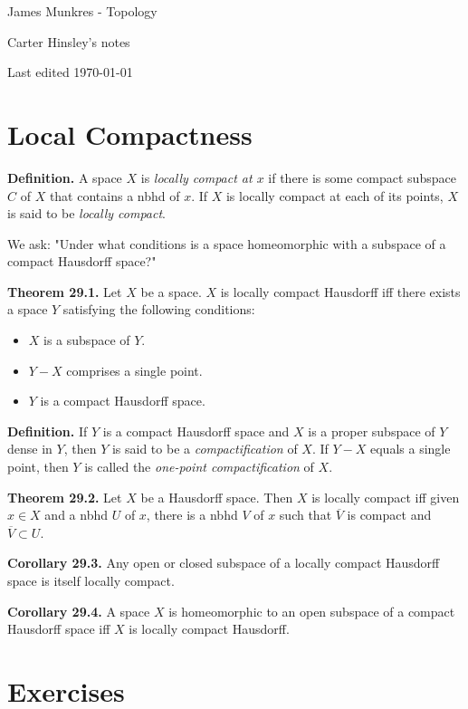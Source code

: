 \documentclass[a4paper]{article}
\begin{document}
\begin{center}
\LARGE{James Munkres - Topology}

\large{Carter Hinsley's notes}

Last edited \today
\end{center}

\setcounter{section}{28}
\section{Local Compactness}

\textbf{Definition.} A space $X$ is \emph{locally compact at $x$} if there is some compact subspace $C$ of $X$ that contains a nbhd of $x$. If $X$ is locally compact at each of its points, $X$ is said to be \emph{locally compact}.

We ask: "Under what conditions is a space homeomorphic with a subspace of a compact Hausdorff space?"

\textbf{Theorem 29.1.} Let $X$ be a space. $X$ is locally compact Hausdorff iff there exists a space $Y$ satisfying the following conditions:
\begin{itemize}
    \item $X$ is a subspace of $Y$.
    \item $Y - X$ comprises a single point.
    \item $Y$ is a compact Hausdorff space.
\end{itemize}

\textbf{Definition.} If $Y$ is a compact Hausdorff space and $X$ is a proper subspace of $Y$ dense in $Y$, then $Y$ is said to be a \emph{compactification} of $X$. If $Y - X$ equals a single point, then $Y$ is called the \emph{one-point compactification} of $X$.

\textbf{Theorem 29.2.} Let $X$ be a Hausdorff space. Then $X$ is locally compact iff given $x \in X$ and a nbhd $U$ of $x$, there is a nbhd $V$ of $x$ such that $\overline{V}$ is compact and $\overline{V} \subset U$.

\textbf{Corollary 29.3.} Any open or closed subspace of a locally compact Hausdorff space is itself locally compact.

\textbf{Corollary 29.4.} A space $X$ is homeomorphic to an open subspace of a compact Hausdorff space iff $X$ is locally compact Hausdorff.

\section*{Exercises}
\end{document}
